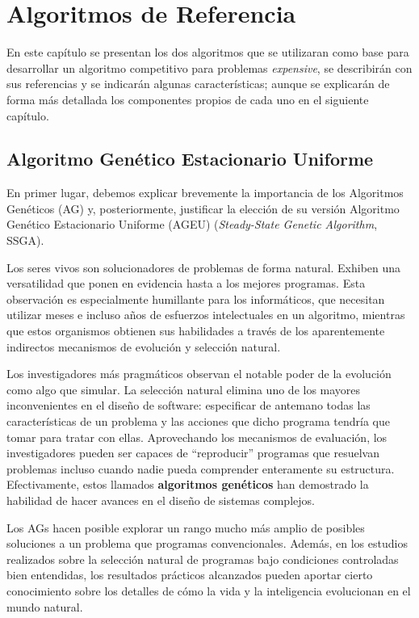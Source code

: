 \chapter{Algoritmos de Referencia}

En este capítulo se presentan los dos algoritmos que se utilizaran como base para desarrollar un algoritmo competitivo para problemas \textit{expensive}, se describirán con sus referencias y se indicarán algunas características; aunque se explicarán de forma más detallada los componentes propios de cada uno en el siguiente capítulo.

\section{Algoritmo Genético Estacionario Uniforme}

En primer lugar, debemos explicar brevemente la importancia de los Algoritmos Genéticos (AG) y, posteriormente, justificar la elección de su versión Algoritmo Genético Estacionario Uniforme (AGEU) (\textit{Steady-State Genetic Algorithm}, SSGA). 

Los seres vivos son solucionadores de problemas de forma natural. 
Exhiben una versatilidad que ponen en evidencia hasta a los mejores programas. 
Esta observación es especialmente humillante para los informáticos, que necesitan utilizar meses e incluso años de esfuerzos intelectuales en un algoritmo, mientras que estos organismos obtienen sus habilidades a través de los aparentemente indirectos mecanismos de evolución y selección natural. 

Los investigadores más pragmáticos observan el notable poder de la evolución como algo que simular. 
La selección natural elimina uno de los mayores inconvenientes en el diseño de software: especificar de antemano todas las características de un problema y las acciones que dicho programa tendría que tomar para tratar con ellas. 
Aprovechando los mecanismos de evaluación, los investigadores pueden ser capaces de ``reproducir'' programas que resuelvan problemas incluso cuando nadie pueda comprender enteramente su estructura. 
Efectivamente, estos llamados \textbf{algoritmos genéticos} han demostrado la habilidad de hacer avances en el diseño de sistemas complejos. 

Los AGs hacen posible explorar un rango mucho más amplio de posibles soluciones a un problema que programas convencionales. 
Además, en los estudios  realizados sobre la selección natural de programas bajo condiciones controladas bien entendidas, los resultados prácticos alcanzados pueden aportar cierto conocimiento sobre los detalles de cómo la vida y la inteligencia evolucionan en el mundo natural. 


